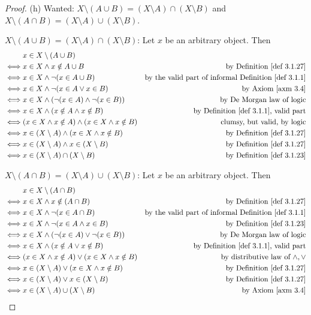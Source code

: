 \begin{proof}{(h)} Wanted: \(X \setminus (A \cup B) = (X \setminus A) \cap (X \setminus B) \) and \(X \setminus (A \cap B) = (X \setminus A) \cup (X \setminus B)\).

\(X \setminus (A \cup B) = (X \setminus A) \cap (X \setminus B) \): Let \(x\) be an arbitrary object. Then
\begin{align*}
         & x \in X \setminus (A \cup B) \\
    \iff & x \in X \land x \notin A \cup B & \text{by \DEF{3.1.27}} \\
    \iff & x \in X \land \lnot(x \in A \cup B) & \text{by the valid part of informal \DEF{3.1.1}} \\
    \iff & x \in X \land \lnot(x \in A \lor x \in B) & \text{by \AXM{3.4}} \\
    \iff & x \in X \land (\lnot(x \in A) \land \lnot(x \in B)) & \text{by De Morgan law of logic} \\
    \iff & x \in X \land (x \notin A \land x \notin B) & \text{by \DEF{3.1.1}, valid part} \\
    \iff & (x \in X \land x \notin A) \land (x \in X \land x \notin B) & \text{clumsy, but valid, by logic} \\
    \iff & x \in (X \setminus A) \land (x \in X \land x \notin B) & \text{by \DEF{3.1.27}} \\
    \iff & x \in (X \setminus A) \land x \in (X \setminus B) & \text{by \DEF{3.1.27}} \\
    \iff & x \in (X \setminus A) \cap (X \setminus B) & \text{by \DEF{3.1.23}}
\end{align*}

\(X \setminus (A \cap B) = (X \setminus A) \cup (X \setminus B) \): Let \(x\) be an arbitrary object. Then
\begin{align*}
         & x \in X \setminus (A \cap B) \\
    \iff & x \in X \land x \notin (A \cap B) & \text{by \DEF{3.1.27}} \\
    \iff & x \in X \land \lnot(x \in A \cap B) & \text{by the valid part of informal \DEF{3.1.1}} \\
    \iff & x \in X \land \lnot(x \in A \land x \in B) & \text{by \DEF{3.1.23}} \\
    \iff & x \in X \land (\lnot(x \in A) \lor \lnot(x \in B)) & \text{by De Morgan law of logic} \\
    \iff & x \in X \land (x \notin A \lor x \notin B) & \text{by \DEF{3.1.1}, valid part} \\
    \iff & (x \in X \land x \notin A) \lor (x \in X \land x \notin B) & \text{by distributive law of \(\land, \lor\)} \\
    \iff & x \in (X \setminus A) \lor (x \in X \land x \notin B) & \text{by \DEF{3.1.27}} \\
    \iff & x \in (X \setminus A) \lor x \in (X \setminus B) & \text{by \DEF{3.1.27}} \\
    \iff & x \in (X \setminus A) \cup (X \setminus B) & \text{by \AXM{3.4}}
\end{align*}
\end{proof}

